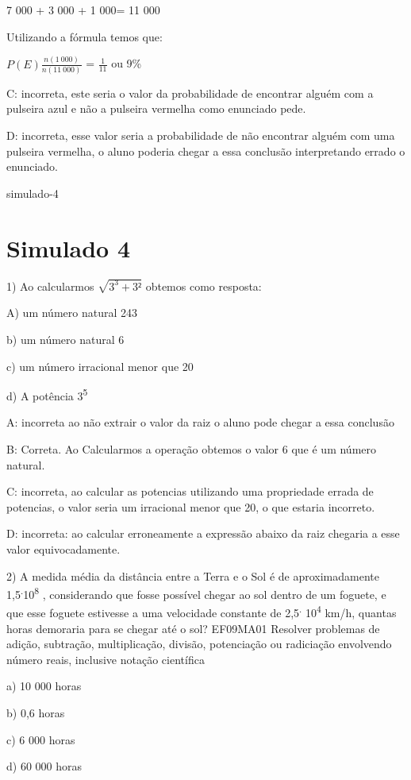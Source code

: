 {7 000 + 3 000 + 1 000= 11 000

Utilizando a fórmula temos que:

\(P(E)\frac{n(1\ 000)}{n(11\ 000)}\) = \(\frac{1}{11}\) ou 9\%

C: incorreta, este seria o valor da probabilidade de encontrar alguém
com a pulseira azul e não a pulseira vermelha como enunciado pede.

D: incorreta, esse valor seria a probabilidade de não encontrar alguém
com uma pulseira vermelha, o aluno poderia chegar a essa conclusão
interpretando errado o enunciado.

simulado-4}{%
\section{Simulado 4}

1) Ao calcularmos \(\sqrt{3^{3} + 3²}\) obtemos como resposta:

A) um número natural 243

b) um número natural 6

c) um número irracional menor que 20

d) A potência 3\textsuperscript{5}

A: incorreta ao não extrair o valor da raiz o aluno pode chegar a essa
conclusão

B: Correta. Ao Calcularmos a operação obtemos o valor 6 que é um número
natural.

C: incorreta, ao calcular as potencias utilizando uma propriedade errada
de potencias, o valor seria um irracional menor que 20, o que estaria
incorreto.

D: incorreta: ao calcular erroneamente a expressão abaixo da raiz
chegaria a esse valor equivocadamente.

2) A medida média da distância entre a Terra e o Sol é de
aproximadamente 1,5\textsuperscript{.}10\textsuperscript{8} ,
considerando que fosse possível chegar ao sol dentro de um foguete, e
que esse foguete estivesse a uma velocidade constante de
2,5\textsuperscript{.} 10\textsuperscript{4} km/h, quantas horas
demoraria para se chegar até o sol? EF09MA01 Resolver problemas de
adição, subtração, multiplicação, divisão, potenciação ou radiciação
envolvendo número reais, inclusive notação científica

a) 10 000 horas

b) 0,6 horas

c) 6 000 horas

d) 60 000 horas

}

